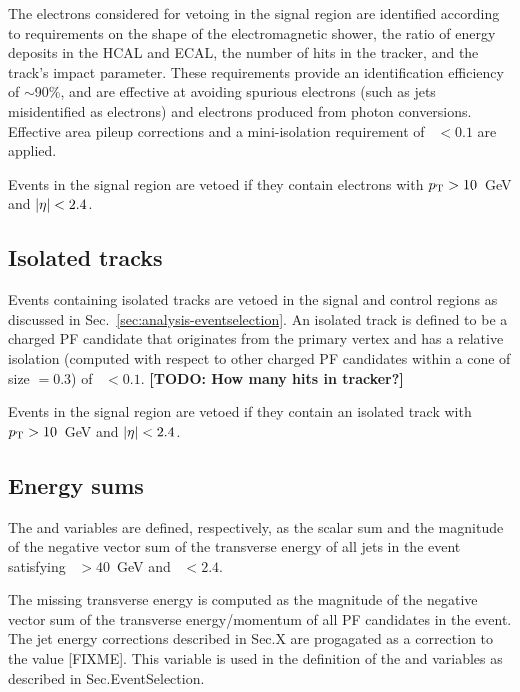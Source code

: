 The electrons considered for vetoing in the signal region are identified 
according to requirements on the shape of the electromagnetic shower, the ratio 
of energy deposits in the HCAL and ECAL, the number of hits in the tracker, and 
the track's impact parameter.  %
These requirements provide an identification efficiency of $\sim$90\%, and are 
effective at %
avoiding spurious electrons (such as jets misidentified as 
electrons) and electrons produced from photon conversions. %
Effective area pileup corrections and a mini-isolation requirement of 
\miniiso~$<0.1$ are applied.

Events in the signal region are vetoed if they contain 
electrons with ${p_{\text T}}>10$~GeV and $|\eta|<2.4$.

\subsection*{Isolated tracks}

Events containing isolated tracks are vetoed in the signal and control regions 
as discussed in Sec.~\ref{sec:analysis-eventselection}. An isolated track is 
defined to be a 
charged PF candidate that originates from the primary vertex and has a relative 
isolation (computed with respect to other charged PF candidates within a cone 
of size \DR$=0.3$) of \reliso~$ < 0.1$.
\textbf{[TODO: How many hits in tracker?]}

Events in the signal region are vetoed if they contain 
an isolated track with ${p_{\text T}}>10$~GeV and $|\eta|<2.4$.

\subsection*{Energy sums}

The \scalht and \MHT variables are defined, respectively, as the scalar sum and 
the magnitude of the negative vector sum of the transverse energy of all jets 
in the event satisfying \pt~$>40$~GeV and \etaabs~$<2.4$.

The missing transverse energy \met is computed as the magnitude of the negative 
vector sum of the transverse energy/momentum of all PF candidates in the event. 
The jet energy corrections described in Sec.X are progagated as a correction to 
the \met value [FIXME]. This variable is used in the definition of the \mt and 
\mhtmet variables as described in Sec.EventSelection.

